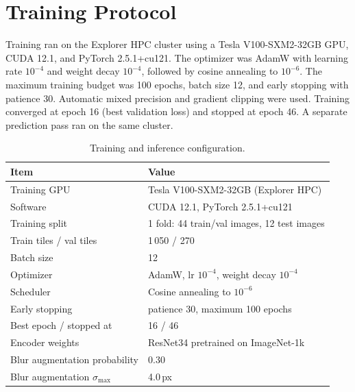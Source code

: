 \documentclass[11pt,letterpaper]{article}
\begin{document}
\section{Training Protocol}
Training ran on the Explorer HPC cluster using a Tesla V100-SXM2-32GB GPU, CUDA 12.1, and PyTorch 2.5.1+cu121. The optimizer was AdamW with learning rate $10^{-4}$ and weight decay $10^{-4}$, followed by cosine annealing to $10^{-6}$. The maximum training budget was 100 epochs, batch size 12, and early stopping with patience 30. Automatic mixed precision and gradient clipping were used. Training converged at epoch 16 (best validation loss) and stopped at epoch 46. A separate prediction pass ran on the same cluster.
\begin{table}[htbp]
\centering
\caption{Training and inference configuration.}
\begin{tabular}{ll}
\toprule
Item & Value \\
\midrule
Training GPU & Tesla V100-SXM2-32GB (Explorer HPC) \\
Software & CUDA 12.1, PyTorch 2.5.1+cu121 \\
Training split & 1 fold: 44 train/val images, 12 test images \\
Train tiles / val tiles & 1\,050 / 270 \\
Batch size & 12 \\
Optimizer & AdamW, lr $10^{-4}$, weight decay $10^{-4}$ \\
Scheduler & Cosine annealing to $10^{-6}$ \\
Early stopping & patience 30, maximum 100 epochs \\
Best epoch / stopped at & 16 / 46 \\
Encoder weights & ResNet34 pretrained on ImageNet-1k \\
Blur augmentation probability & 0.30 \\
Blur augmentation $\sigma_{\max}$ & 4.0\,px \\
\bottomrule
\end{tabular}
\label{tab:training-info}
\end{table}
\end{document}
